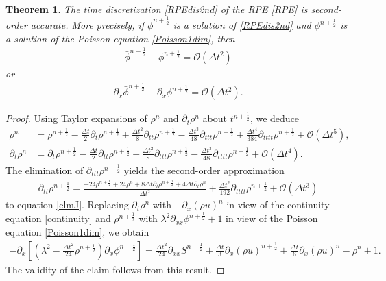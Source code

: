\documentclass[letterpaper,10pt]{article}
\newtheorem{theorem}{Theorem}[section]
\numberwithin{equation}{section}
\numberwithin{figure}{section}
\numberwithin{table}{section}
\begin{document}
\begin{theorem}
The time discretization \eqref{RPEdis2nd} of the RPE \eqref{RPE} is second-order accurate. More precisely, if $\bar{\phi}^{n+\frac{1}{2}}$ is a solution of \eqref{RPEdis2nd} and $\phi^{n+\frac{1}{2}}$ is a solution of the Poisson equation \eqref{Poisson1dim}, then
    \begin{align*}
        \bar{\phi}^{n+\frac{1}{2}}-\phi^{n+\frac{1}{2}}=\mathcal{O}(\Delta t^2)
    \end{align*}
or
    \begin{align*}
        \partial_x\bar{\phi}^{n+\frac{1}{2}}-\partial_x\phi^{n+\frac{1}{2}}=\mathcal{O}(\Delta t^2).
    \end{align*}
\end{theorem}
\begin{proof}
Using Taylor expansions of $\rho^n$ and $\partial_t\rho^n$ about $t^{n+\frac{1}{2}}$,
we deduce 
\begin{align*}
    \rho^n & =\rho^{n+\frac{1}{2}}-\frac{\Delta t}{2} \partial_t \rho^{n+\frac{1}{2}}+\frac{\Delta t^2}{8} \partial_{t t} \rho^{n+\frac{1}{2}}-\frac{\Delta t^3}{48} \partial_{t t t} \rho^{n+\frac{1}{2}}+\frac{\Delta t^4}{384} \partial_{t t t t} \rho^{n+\frac{1}{2}}+\mathcal{O}\left(\Delta t^5\right), \\
    \partial_t \rho^n & =\partial_t \rho^{n+\frac{1}{2}}-\frac{\Delta t}{2} \partial_{t t} \rho^{n+\frac{1}{2}}+\frac{\Delta t^2}{8} \partial_{t t t} \rho^{n+\frac{1}{2}}-\frac{\Delta t^3}{48} \partial_{t t t t} \rho^{n+\frac{1}{2}}+\mathcal{O}\left(\Delta t^4\right).
\end{align*}
The elimination of $\partial_{ttt} \rho^{n+\frac{1}{2}}$ yields the second-order approximation
\begin{align}\label{2ndeq}
    \partial_{tt} \rho^{n+\frac{1}{2}}=\frac{-24 \rho^{n+\frac{1}{2}}+24 \rho^n+8 \Delta t \partial_t \rho^{n+\frac{1}{2}}+4 \Delta t \partial_t \rho^n}{\Delta t^2}+\frac{\Delta t^2}{192} \partial_{t t t t} \rho^{n+\frac{1}{2}}+\mathcal{O}\left(\Delta t^3\right) 
\end{align}
to equation \eqref{elmJ}. Replacing $\partial_t\rho^n$ with $-\partial_x(\rho u)^n$ in view of the continuity equation \eqref{continuity} and $\rho^{n+\frac{1}{2}}$ with $\lambda^2\partial_{xx}\phi^{n+\frac{1}{2}}+1$ in view of the Poisson equation \eqref{Poisson1dim}, we obtain
\begin{align*}
    -\partial_x\left[\left(\lambda^2-\frac{\Delta t^2}{24} \rho^{n+\frac{1}{2}}\right) \partial_x \phi^{n+\frac{1}{2}}\right] =\frac{\Delta t^2}{24} \partial_{x x} S^{n+\frac{1}{2}}  +\frac{\Delta t}{3} \partial_x(\rho u)^{n+\frac{1}{2}}+\frac{\Delta t}{6} \partial_x(\rho u)^n-\rho^n+1.
\end{align*}
The validity of the claim follows from this result.
\end{proof}
\end{document}
